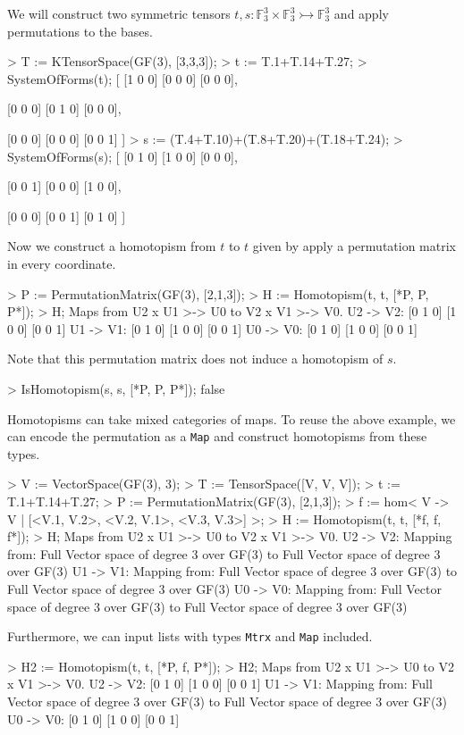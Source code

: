 \begin{example}[HomotopismConst]

We will construct two symmetric tensors
$t,s:\mathbb{F}_3^3\times\mathbb{F}_3^3\rightarrowtail\mathbb{F}_3^3$ and apply
permutations to the bases.
\begin{code}
> T := KTensorSpace(GF(3), [3,3,3]);
> t := T.1+T.14+T.27;
> SystemOfForms(t);
[
    [1 0 0]
    [0 0 0]
    [0 0 0],

    [0 0 0]
    [0 1 0]
    [0 0 0],

    [0 0 0]
    [0 0 0]
    [0 0 1]
]
> s := (T.4+T.10)+(T.8+T.20)+(T.18+T.24);
> SystemOfForms(s);
[
    [0 1 0]
    [1 0 0]
    [0 0 0],

    [0 0 1]
    [0 0 0]
    [1 0 0],

    [0 0 0]
    [0 0 1]
    [0 1 0]
]
\end{code}

Now we construct a homotopism from $t$ to $t$ given by apply a permutation matrix in every coordinate.
\begin{code}
> P := PermutationMatrix(GF(3), [2,1,3]);
> H := Homotopism(t, t, [*P, P, P*]);
> H;
Maps from U2 x U1 >-> U0 to V2 x V1 >-> V0.
U2 -> V2: 
[0 1 0]
[1 0 0]
[0 0 1]
U1 -> V1: 
[0 1 0]
[1 0 0]
[0 0 1]
U0 -> V0: 
[0 1 0]
[1 0 0]
[0 0 1]
\end{code}

Note that this permutation matrix does not induce a homotopism of $s$.
\begin{code}
> IsHomotopism(s, s, [*P, P, P*]);
false
\end{code}
\end{example}

\begin{example}[MixedHomotopisms] Homotopisms can take mixed categories of maps.
To reuse the above example, we can encode the permutation as a \texttt{Map} and
construct homotopisms from these types.
\begin{code}
> V := VectorSpace(GF(3), 3);
> T := TensorSpace([V, V, V]);
> t := T.1+T.14+T.27;
> P := PermutationMatrix(GF(3), [2,1,3]);
> f := hom< V -> V | [<V.1, V.2>, <V.2, V.1>, <V.3, V.3>] >;
> H := Homotopism(t, t, [*f, f, f*]);
> H;
Maps from U2 x U1 >-> U0 to V2 x V1 >-> V0.
U2 -> V2: Mapping from: Full Vector space of degree 3 over GF(3) to Full 
Vector space of degree 3 over GF(3)
U1 -> V1: Mapping from: Full Vector space of degree 3 over GF(3) to Full 
Vector space of degree 3 over GF(3)
U0 -> V0: Mapping from: Full Vector space of degree 3 over GF(3) to Full 
Vector space of degree 3 over GF(3)
\end{code}

Furthermore, we can input lists with types \texttt{Mtrx} and \texttt{Map} included.
\begin{code}
> H2 := Homotopism(t, t, [*P, f, P*]);
> H2;
Maps from U2 x U1 >-> U0 to V2 x V1 >-> V0.
U2 -> V2: 
[0 1 0]
[1 0 0]
[0 0 1]
U1 -> V1: Mapping from: Full Vector space of degree 3 over GF(3) to Full 
Vector space of degree 3 over GF(3)
U0 -> V0: 
[0 1 0]
[1 0 0]
[0 0 1]
\end{code}
\end{example}


